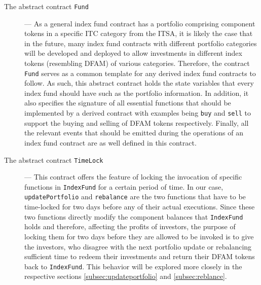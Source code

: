 \begin{description}
  \item[The abstract contract \texttt{Fund}] ---  As a general index fund contract has a portfolio comprising component tokens in a specific ITC category from the ITSA, it is likely the case that in the future, many index fund contracts with different portfolio categories will be developed and deployed to allow investments in different index tokens (resembling DFAM) of various categories. Therefore, the contract \texttt{Fund} serves as a common template for any derived index fund contracts to follow. As such, this abstract contract holds the state variables that every index fund should have such as the portfolio information. In addition, it also specifies the signature of all essential functions that should be implemented by a derived contract with examples being \texttt{buy} and \texttt{sell} to support the buying and selling of DFAM tokens respectively. Finally, all the relevant events that should be emitted during the operations of an index fund contract are as well defined in this contract.
  
  \item[The abstract contract \texttt{TimeLock}] --- This contract offers the feature of locking the invocation of specific functions in \texttt{IndexFund} for a certain period of time. In our case, \texttt{updatePortfolio} and \texttt{rebalance} are the two functions that have to be time-locked for two days before any of their actual executions. Since these two functions directly modify the component balances that \texttt{IndexFund} holds and therefore, affecting the profits of investors, the purpose of locking them  for two days before they are allowed to be invoked is to give the investors, who disagree with the next portfolio update or rebalancing sufficient time to redeem their investments and return their DFAM tokens back to \texttt{IndexFund}. This behavior will be explored more closely in the respective sections \ref{subsec:updateportfolio} and \ref{subsec:reblance}.
  
  
\end{description}

